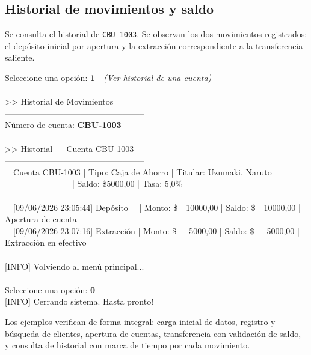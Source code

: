\documentclass[12pt, a4paper]{article}
\begin{document}
\newpage
\subsection{Historial de movimientos y saldo}

Se consulta el historial de \texttt{CBU-1003}. Se observan los dos
movimientos registrados: el depósito inicial por apertura y la
extracción correspondiente a la transferencia saliente.

\begin{tcolorbox}[
  enhanced, breakable,
  colback=black!92!white,
  colframe=black!60!white,
  coltext=green!70!white,
  boxrule=0.5pt,
  arc=4pt,
  fontupper=\ttfamily\small
]
Seleccione una opción: \textbf{1}~~\textrm{\textit{(Ver historial de una cuenta)}}\\
~\\
\textgreater\textgreater{} Historial de Movimientos\\
--------------------------------------------------\\
Número de cuenta: \textbf{CBU-1003}\\
~\\
\textgreater\textgreater{} Historial --- Cuenta CBU-1003\\
--------------------------------------------------\\
~~Cuenta CBU-1003 | Tipo: Caja de Ahorro | Titular: Uzumaki, Naruto\\
~~~~~~~~~~~~~~~~| Saldo: \$5000,00 | Tasa: 5,0\%\\
~\\
~~[09/06/2026 23:05:44] Depósito~~ | Monto: \$~~10000,00 | Saldo: \$~~10000,00 | Apertura de cuenta\\
~~[09/06/2026 23:07:16] Extracción | Monto: \$~~~5000,00 | Saldo: \$~~~5000,00 | Extracción en efectivo\\
~\\
{[INFO]} Volviendo al menú principal...\\
~\\
Seleccione una opción: \textbf{0}\\
{[INFO]} Cerrando sistema. Hasta pronto!
\end{tcolorbox}

\vspace{1em}

Los ejemplos verifican de forma integral: carga inicial de datos,
registro y búsqueda de clientes, apertura de cuentas, transferencia
con validación de saldo, y consulta de historial con marca de tiempo
por cada movimiento.
\end{document}
